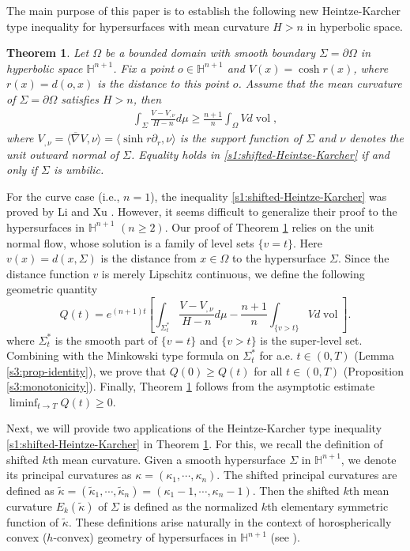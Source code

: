 \documentclass[11pt,reqno]{amsart}
\newtheorem{thm}{Theorem}[section]
\theoremstyle{definition}
\theoremstyle{remark}
\numberwithin{equation}{section}
\renewcommand{\(}{\left(}
\renewcommand{\)}{\right)}
\renewcommand{\~}{\widetilde}
\renewcommand{\-}{\overline}
\renewcommand{\k}{\kappa}
\newcommand{\ra}{\rightarrow}
\newcommand{\vol}{\operatorname{vol}}
\begin{document}
The main purpose of this paper is to establish the following new Heintze-Karcher type inequality for hypersurfaces with mean curvature $H>n$ in hyperbolic space.
\begin{thm}\label{s1:main-thm}
	Let $\Omega$ be a bounded domain with smooth boundary $\Sigma=\partial \Omega$ in hyperbolic space $\mathbb H^{n+1}$. Fix a point $o\in \mathbb H^{n+1}$ and $V(x)=\cosh r(x)$, where $r(x)=d(o,x)$ is the distance to this point $o$. Assume that the mean curvature of $\Sigma=\partial\Omega$ satisfies $H>n$, then
	\begin{align}\label{s1:shifted-Heintze-Karcher}
	\int_{\Sigma} \frac{V-V_{,\nu}}{H-n} d\mu  \geq \frac{n+1}{n}\int_{\Omega} V d\vol,
	\end{align}
	where $V_{,\nu}=\langle \-\nabla V,\nu\rangle=\langle \sinh r \partial_r,\nu \rangle$ is the support function of $\Sigma$ and $\nu$ denotes the unit outward normal of $\Sigma$. Equality holds in \eqref{s1:shifted-Heintze-Karcher} if and only if $\Sigma$ is umbilic.
\end{thm}
For the curve case (i.e., $n=1$), the inequality \eqref{s1:shifted-Heintze-Karcher} was proved by Li and Xu \cite[Proposition 8.2]{Li-Xu2022}. However, it seems difficult to generalize their proof to the hypersurfaces in $\mathbb H^{n+1}$ $(n\geq 2)$. Our proof of Theorem \ref{s1:main-thm} relies on the unit normal flow, whose solution is a family of level sets $\{v=t\}$. Here $v(x)=d(x,\Sigma)$ is the distance  from $x\in\Omega$ to the hypersurface $\Sigma$. Since the distance function $v$ is merely Lipschitz continuous, we define the following geometric quantity
$$
Q(t)=e^{(n+1)t}\left[\int_{\Sigma_t^\ast}\frac{V-V_{,\nu}}{H-n}d\mu-\frac{n+1}{n}\int_{\{v>t\}} V d\vol\right].
$$
where $\Sigma_t^\ast$ is the smooth part of $\{v=t\}$ and $\{v>t\}$ is the super-level set.  Combining with the Minkowski type formula on $\Sigma_t^\ast$ for a.e. $t\in (0,T)$ (Lemma \ref{s3:prop-identity}), we prove that $Q(0)\geq Q(t)$ for all $t\in (0,T)$ (Proposition \ref{s3:monotonicity}). Finally, Theorem \ref{s1:main-thm} follows from the asymptotic estimate $\liminf_{t\ra T} Q(t)\geq 0$.

Next, we will provide two applications of the Heintze-Karcher type inequality \eqref{s1:shifted-Heintze-Karcher} in Theorem \ref{s1:main-thm}.   For this, we recall the definition of shifted $k$th mean curvature. Given a smooth hypersurface $\Sigma$ in $\mathbb{H}^{n+1}$, we denote its principal curvatures as $\kappa=(\kappa_1,\cdots,\kappa_n)$. The shifted principal curvatures are defined as $\tilde{\kappa}=(\~\k_1,\cdots,\~\k_n)=(\k_1-1,\cdots,\k_n-1)$. Then the shifted $k$th mean curvature $E_k(\~{\k})$ of $\Sigma$ is defined as the normalized $k$th elementary symmetric function of $\tilde{\kappa}$. These definitions arise naturally in the context of horospherically convex ($h$-convex) geometry of hypersurfaces in $\mathbb{H}^{n+1}$ (see \cite{ACW2021,Esp09}).
\end{document}
